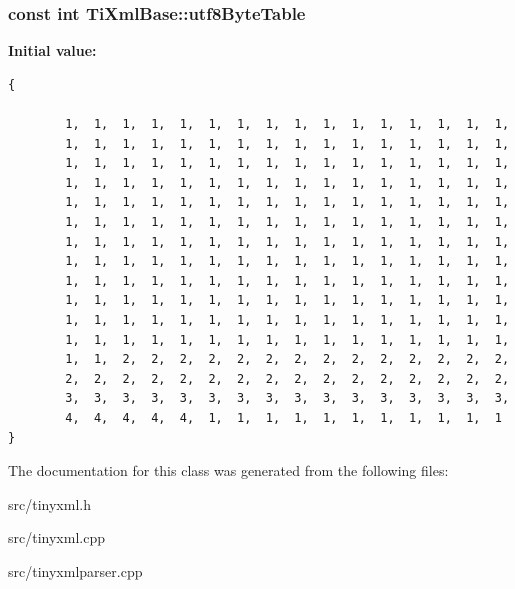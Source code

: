 \subsubsection{\setlength{\rightskip}{0pt plus 5cm}const int Ti\-Xml\-Base::utf8Byte\-Table\hspace{0.3cm}{\tt  [static, inherited]}}\label{classTiXmlBase_TiXmlUnknowns0}


{\bf Initial value:}

\footnotesize\begin{verbatim} 
{
    
        1,  1,  1,  1,  1,  1,  1,  1,  1,  1,  1,  1,  1,  1,  1,  1,  
        1,  1,  1,  1,  1,  1,  1,  1,  1,  1,  1,  1,  1,  1,  1,  1,  
        1,  1,  1,  1,  1,  1,  1,  1,  1,  1,  1,  1,  1,  1,  1,  1,  
        1,  1,  1,  1,  1,  1,  1,  1,  1,  1,  1,  1,  1,  1,  1,  1,  
        1,  1,  1,  1,  1,  1,  1,  1,  1,  1,  1,  1,  1,  1,  1,  1,  
        1,  1,  1,  1,  1,  1,  1,  1,  1,  1,  1,  1,  1,  1,  1,  1,  
        1,  1,  1,  1,  1,  1,  1,  1,  1,  1,  1,  1,  1,  1,  1,  1,  
        1,  1,  1,  1,  1,  1,  1,  1,  1,  1,  1,  1,  1,  1,  1,  1,  
        1,  1,  1,  1,  1,  1,  1,  1,  1,  1,  1,  1,  1,  1,  1,  1,  
        1,  1,  1,  1,  1,  1,  1,  1,  1,  1,  1,  1,  1,  1,  1,  1,  
        1,  1,  1,  1,  1,  1,  1,  1,  1,  1,  1,  1,  1,  1,  1,  1,  
        1,  1,  1,  1,  1,  1,  1,  1,  1,  1,  1,  1,  1,  1,  1,  1,  
        1,  1,  2,  2,  2,  2,  2,  2,  2,  2,  2,  2,  2,  2,  2,  2,  
        2,  2,  2,  2,  2,  2,  2,  2,  2,  2,  2,  2,  2,  2,  2,  2,  
        3,  3,  3,  3,  3,  3,  3,  3,  3,  3,  3,  3,  3,  3,  3,  3,  
        4,  4,  4,  4,  4,  1,  1,  1,  1,  1,  1,  1,  1,  1,  1,  1   
}
\end{verbatim}\normalsize 


The documentation for this class was generated from the following files:\begin{CompactItemize}
\item 
src/tinyxml.h\item 
src/tinyxml.cpp\item 
src/tinyxmlparser.cpp\end{CompactItemize}
